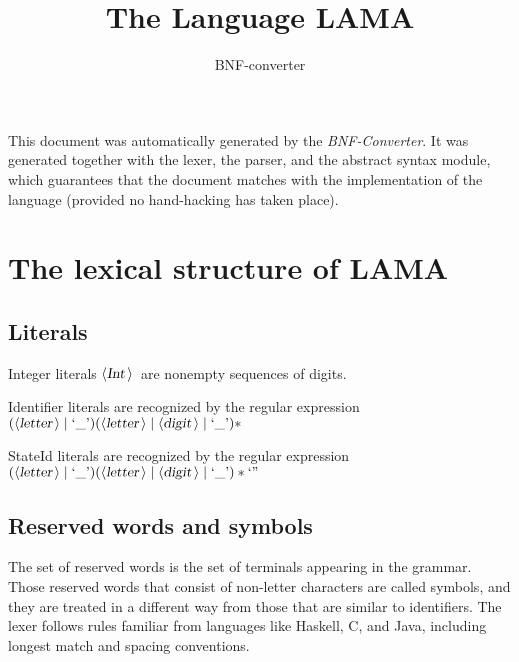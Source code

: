 \documentclass[a4paper,11pt]{article}
\author{BNF-converter}
\title{The Language LAMA}
\begin{document}
\maketitle

\newcommand{\emptyP}{\mbox{$\epsilon$}}
\newcommand{\terminal}[1]{\mbox{{\textbf{\texttt {#1}}}}}
\newcommand{\nonterminal}[1]{\mbox{$\langle \mbox{{\sl #1 }} \! \rangle$}}
\newcommand{\arrow}{\mbox{::=}}
\newcommand{\delimit}{\mbox{$|$}}
\newcommand{\reserved}[1]{\mbox{{\texttt {#1}}}}
\newcommand{\literal}[1]{\mbox{{\texttt {#1}}}}
\newcommand{\symb}[1]{\mbox{{\texttt {#1}}}}

This document was automatically generated by the {\em BNF-Converter}. It was generated together with the lexer, the parser, and the abstract syntax module, which guarantees that the document matches with the implementation of the language (provided no hand-hacking has taken place).

\section*{The lexical structure of LAMA}

\subsection*{Literals}
Integer literals \nonterminal{Int}\ are nonempty sequences of digits.





Identifier literals are recognized by the regular expression
\(({\nonterminal{letter}} \mid \mbox{`\_'}) ({\nonterminal{letter}} \mid {\nonterminal{digit}} \mid \mbox{`\_'})*\)

StateId literals are recognized by the regular expression
\(({\nonterminal{letter}} \mid \mbox{`\_'}) ({\nonterminal{letter}} \mid {\nonterminal{digit}} \mid \mbox{`\_'})* \mbox{`''}\)


\subsection*{Reserved words and symbols}
The set of reserved words is the set of terminals appearing in the grammar. Those reserved words that consist of non-letter characters are called symbols, and they are treated in a different way from those that are similar to identifiers. The lexer follows rules familiar from languages like Haskell, C, and Java, including longest match and spacing conventions.
\end{document}
